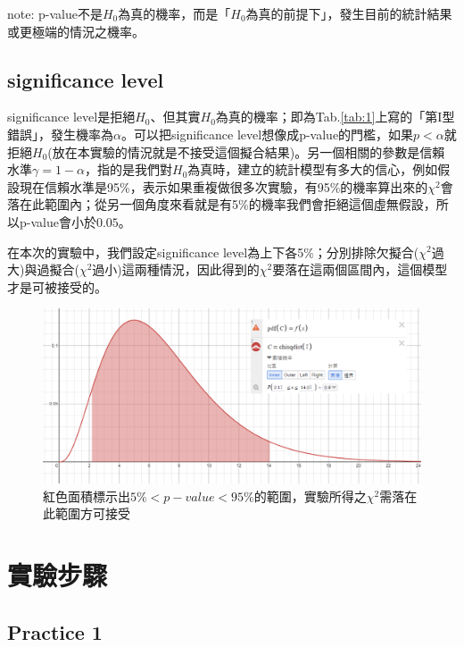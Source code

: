 \documentclass[12pt,a4paper]{article}
\begin{document}
\begin{CJK}{UTF8}{bkai}
note: p-value不是$H_0$為真的機率，而是「$H_0$為真的前提下」，發生目前的統計結果或更極端的情況之機率。

\clearpage

\subsection{significance level}
\hfill

significance level是拒絕$H_0$、但其實$H_0$為真的機率；即為Tab.\ref{tab:1}上寫的「第I型錯誤」，發生機率為$\alpha$。可以把significance level想像成p-value的門檻，如果$p<\alpha$就拒絕$H_0$(放在本實驗的情況就是不接受這個擬合結果)。另一個相關的參數是信賴水準$\gamma=1-\alpha$，指的是我們對$H_0$為真時，建立的統計模型有多大的信心，例如假設現在信賴水準是95\%，表示如果重複做很多次實驗，有95\%的機率算出來的$\chi^2$會落在此範圍內；從另一個角度來看就是有5\%的機率我們會拒絕這個虛無假設，所以p-value會小於$0.05$。

在本次的實驗中，我們設定significance level為上下各5\%；分別排除欠擬合($\chi^2$過大)與過擬合($\chi^2$過小)這兩種情況，因此得到的$\chi^2$要落在這兩個區間內，這個模型才是可被接受的。

\begin{figure}[h]
    \centering
    \includegraphics[width=1\linewidth]{figures/RF/desmos_4.png}
    \caption{紅色面積標示出$5\%<p-value<95\%$的範圍，實驗所得之$\chi^2$需落在此範圍方可接受}
    \label{fig:sig_level}
\end{figure}





\clearpage
\section{實驗步驟}

\subsection{Practice 1}
\hfill


\end{CJK}
\end{document}
